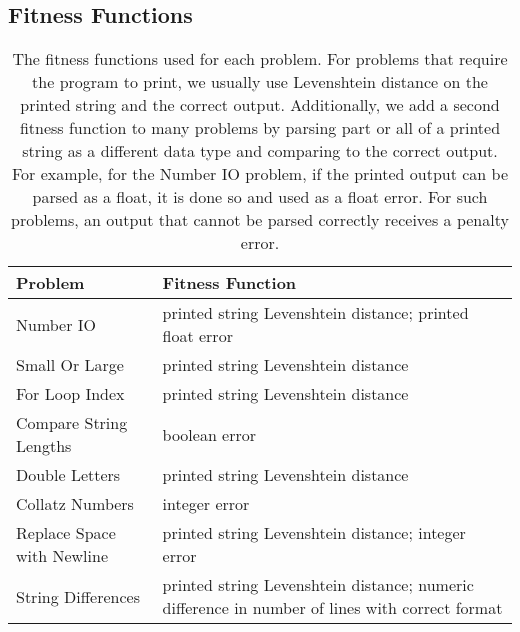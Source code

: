 \documentclass{sig-alternate}
\begin{document}
\subsection{Fitness Functions}

\begin{table*}[t]
\centering
\caption{The fitness functions used for each problem. For problems that require the program to print, we usually use Levenshtein distance on the printed string and the correct output. Additionally, we add a second fitness function to many problems by parsing part or all of a printed string as a different data type and comparing to the correct output. For example, for the Number IO problem, if the printed output can be parsed as a float, it is done so and used as a float error. For such problems, an output that cannot be parsed correctly receives a penalty error.}
\label{tableFitnessFunctions}
\begin{tabular}{>{\raggedright}p{4cm} >{\raggedright}p{11cm}}
\toprule
\textbf{Problem}               & \textbf{Fitness Function}                                                                                                                        \tabularnewline
\midrule
Number IO                  & printed string Levenshtein distance; printed float error                                                                              \tabularnewline
Small Or Large             & printed string Levenshtein distance                                                                                                   \tabularnewline
For Loop Index             & printed string Levenshtein distance                                                                                                   \tabularnewline
Compare String Lengths     & boolean error                                                                                                                  \tabularnewline
Double Letters             & printed string Levenshtein distance                                                                                                   \tabularnewline
Collatz Numbers            & integer error                                                                                                                  \tabularnewline
Replace Space with Newline & printed string Levenshtein distance; integer error                                                                                    \tabularnewline
String Differences         & printed string Levenshtein distance; numeric difference in number of lines with correct format                                                \tabularnewline

\end{tabular}
\end{table*}
\end{document}
